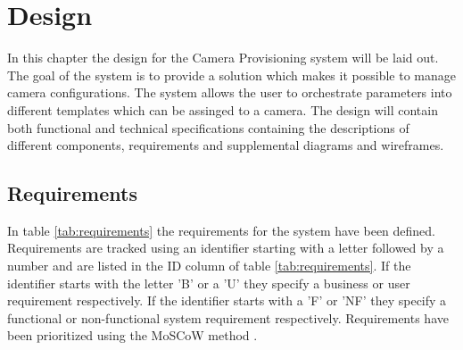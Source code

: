 \chapter{Design}
\label{sec:design}
In this chapter the design for the Camera Provisioning system will be laid out.
The goal of the system is to provide a solution which makes it possible to manage camera configurations.
The system allows the user to orchestrate parameters into different templates which can be assinged to a camera.
The design will contain both functional and technical specifications containing the descriptions of different components, requirements and supplemental diagrams and wireframes.
\section{Requirements}
In table \ref{tab:requirements} the requirements for the system have been defined. Requirements are tracked using an identifier starting with a letter followed by a
number and are listed in the ID column of table \ref{tab:requirements}. If the identifier starts with the letter 'B' or a 'U' they specify a business or user requirement respectively. If the identifier starts with a 'F' or 'NF' they specify a functional or non-functional system requirement respectively.
Requirements have been prioritized using the MoSCoW method \cite{noauthor_moscow_nodate}.
